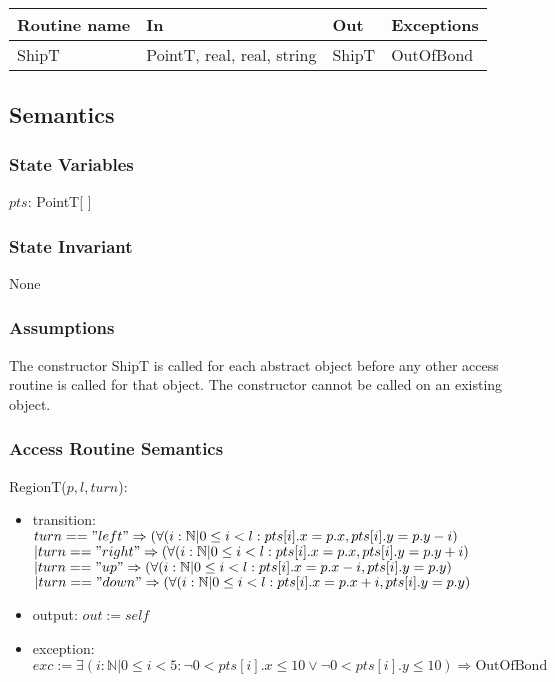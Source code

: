 \documentclass[12pt]{article}
\begin{document}
\begin{tabular}{| l | l | l | l |}
\hline
\textbf{Routine name} & \textbf{In} & \textbf{Out} & \textbf{Exceptions}\\
\hline
ShipT & PointT, real, real, string & ShipT & OutOfBond\\
\hline 
\end{tabular}

\subsection* {Semantics}

\subsubsection* {State Variables}

$\mathit{pts}$: PointT[ ] \\

\subsubsection* {State Invariant}
None

\subsubsection* {Assumptions}
The constructor ShipT is called for each abstract object before any other access routine is called for that
object.  The constructor cannot be called on an existing object.

\subsubsection* {Access Routine Semantics}

\noindent RegionT($p, l, turn$):
\begin{itemize}
\item transition: $turn == "left" \Rightarrow (\forall(i:\mathbb{N}| 0 \leq i < l:
pts[i].x=p.x,pts[i].y=p.y-i) $ \\
$| turn == "right" \Rightarrow (\forall(i:\mathbb{N}| 0 \leq i < l:
pts[i].x=p.x,pts[i].y=p.y+i) $ \\
$| turn == "up" \Rightarrow (\forall(i:\mathbb{N}| 0 \leq i < l:
pts[i].x=p.x-i,pts[i].y=p.y) $ \\
$| turn == "down" \Rightarrow (\forall(i:\mathbb{N}| 0 \leq i < l:
pts[i].x=p.x+i,pts[i].y=p.y) $
\item output: $out := \mathit{self}$
\item exception: $exc := \exists ( i: \mathbb{N} | 0 \leq i < 5:
\neg 0 < pts[i].x \leq 10 \vee 
\neg 0 < pts[i].y \leq 10) \Rightarrow \mbox{OutOfBond}$
\end{itemize}
\end{document}
